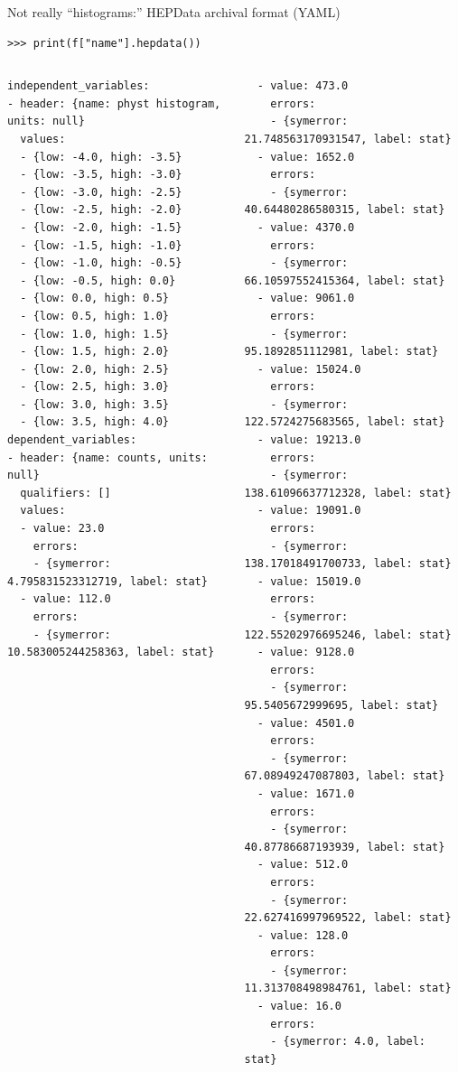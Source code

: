 \documentclass[aspectratio=169]{beamer}
\begin{document}
\begin{frame}[fragile]{Not really ``histograms:'' HEPData archival format (YAML)}
\small
\begin{verbatim}
>>> print(f["name"].hepdata())
\end{verbatim}

\tiny
\vspace{-0.6 cm}
\begin{columns}[t]
\begin{verbatim}
independent_variables:
- header: {name: physt histogram, units: null}
  values:
  - {low: -4.0, high: -3.5}
  - {low: -3.5, high: -3.0}
  - {low: -3.0, high: -2.5}
  - {low: -2.5, high: -2.0}
  - {low: -2.0, high: -1.5}
  - {low: -1.5, high: -1.0}
  - {low: -1.0, high: -0.5}
  - {low: -0.5, high: 0.0}
  - {low: 0.0, high: 0.5}
  - {low: 0.5, high: 1.0}
  - {low: 1.0, high: 1.5}
  - {low: 1.5, high: 2.0}
  - {low: 2.0, high: 2.5}
  - {low: 2.5, high: 3.0}
  - {low: 3.0, high: 3.5}
  - {low: 3.5, high: 4.0}
dependent_variables:
- header: {name: counts, units: null}
  qualifiers: []
  values:
  - value: 23.0
    errors:
    - {symerror: 4.795831523312719, label: stat}
  - value: 112.0
    errors:
    - {symerror: 10.583005244258363, label: stat}
\end{verbatim}
\begin{verbatim}
  - value: 473.0
    errors:
    - {symerror: 21.748563170931547, label: stat}
  - value: 1652.0
    errors:
    - {symerror: 40.64480286580315, label: stat}
  - value: 4370.0
    errors:
    - {symerror: 66.10597552415364, label: stat}
  - value: 9061.0
    errors:
    - {symerror: 95.1892851112981, label: stat}
  - value: 15024.0
    errors:
    - {symerror: 122.5724275683565, label: stat}
  - value: 19213.0
    errors:
    - {symerror: 138.61096637712328, label: stat}
  - value: 19091.0
    errors:
    - {symerror: 138.17018491700733, label: stat}
  - value: 15019.0
    errors:
    - {symerror: 122.55202976695246, label: stat}
  - value: 9128.0
    errors:
    - {symerror: 95.5405672999695, label: stat}
  - value: 4501.0
    errors:
    - {symerror: 67.08949247087803, label: stat}
  - value: 1671.0
    errors:
    - {symerror: 40.87786687193939, label: stat}
  - value: 512.0
    errors:
    - {symerror: 22.627416997969522, label: stat}
  - value: 128.0
    errors:
    - {symerror: 11.313708498984761, label: stat}
  - value: 16.0
    errors:
    - {symerror: 4.0, label: stat}
\end{verbatim}
\end{columns}
\end{frame}
\end{document}
